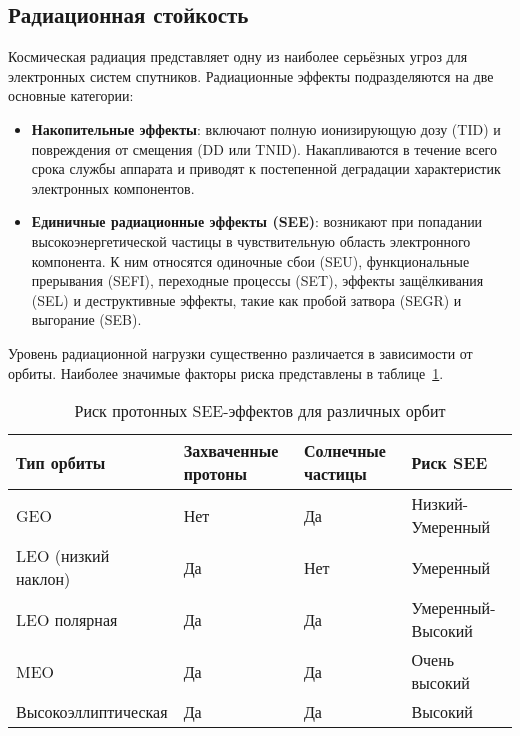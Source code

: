 \subsection{Радиационная стойкость}

Космическая радиация представляет одну из наиболее серьёзных угроз для электронных систем спутников. Радиационные эффекты подразделяются на две основные категории:

\begin{itemize}
	\item \textbf{Накопительные эффекты}: включают полную ионизирующую дозу (TID) и повреждения от смещения (DD или TNID). Накапливаются в течение всего срока службы аппарата и приводят к постепенной деградации характеристик электронных компонентов\cite{esa_radiation_standard}.

	\item \textbf{Единичные радиационные эффекты (SEE)}: возникают при попадании высокоэнергетической частицы в чувствительную область электронного компонента. К ним относятся одиночные сбои (SEU), функциональные прерывания (SEFI), переходные процессы (SET), эффекты защёлкивания (SEL) и деструктивные эффекты, такие как пробой затвора (SEGR) и выгорание (SEB)\cite{escc_see_test}.
\end{itemize}

Уровень радиационной нагрузки существенно различается в зависимости от орбиты. Наиболее значимые факторы риска представлены в таблице~\ref{tab:radiation_risk_orbits}.

\begin{table}[htbp]
	\centering
	\small
	\renewcommand{\arraystretch}{1.5}
	\begin{tabular}{|p{4.5cm}|p{3cm}|p{3.5cm}|p{4cm}|}
		\hline
		\textbf{Тип орбиты} & \textbf{Захваченные протоны} & \textbf{Солнечные частицы} & \textbf{Риск SEE} \\
		\hline
		GEO                 & Нет                          & Да                         & Низкий-Умеренный  \\
		\hline
		LEO (низкий наклон) & Да                           & Нет                        & Умеренный         \\
		\hline
		LEO полярная        & Да                           & Да                         & Умеренный-Высокий \\
		\hline
		MEO                 & Да                           & Да                         & Очень высокий     \\
		\hline
		Высокоэллиптическая & Да                           & Да                         & Высокий           \\
		\hline
	\end{tabular}
	\caption{Риск протонных SEE-эффектов для различных орбит}
	\label{tab:radiation_risk_orbits}
\end{table}



